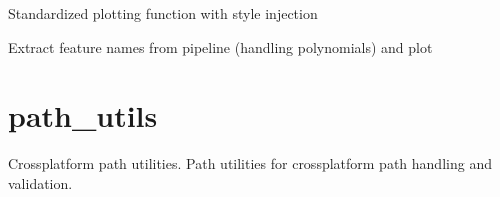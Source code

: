 \documentclass[a4paper,11pt,english,openany,oneside]{sphinxmanual}
\begin{document}

\begin{fulllineitems}
\label{\detokenize{modules/core:core.regression.plot_results}}
\pysigstartsignatures
\pysiglinewithargsret
{}
{\sphinxparamcomma {}\sphinxparamcomma {}\sphinxparamcomma {}\sphinxparamcomma {}\sphinxparamcomma {}}
{}
\pysigstopsignatures
\sphinxAtStartPar
Standardized plotting function with style injection

\end{fulllineitems}


\begin{fulllineitems}
\label{\detokenize{modules/core:core.regression.plot_importance}}
\pysigstartsignatures
\pysiglinewithargsret
{}
{\sphinxparamcomma {}\sphinxparamcomma {}\sphinxparamcomma {}\sphinxparamcomma {}\sphinxparamcomma {}}
{}
\pysigstopsignatures
\sphinxAtStartPar
Extract feature names from pipeline (handling polynomials) and plot

\end{fulllineitems}



\section{path\_utils}
\label{\detokenize{modules/core:path-utils}}
\sphinxAtStartPar
Cross\sphinxhyphen{}platform path utilities.
\label{\detokenize{modules/core:module-core.path_utils}}
\sphinxAtStartPar
Path utilities for cross\sphinxhyphen{}platform path handling and validation.
\end{document}

